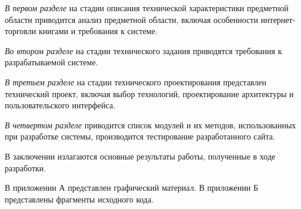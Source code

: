 \emph{В первом разделе} на стадии описания технической характеристики предметной области приводится анализ предметной области, включая особенности интернет-торговли книгами и требования к системе.

\emph{Во втором разделе} на стадии технического задания приводятся требования к разрабатываемой системе.

\emph{В третьем разделе} на стадии технического проектирования представлен технический проект, включая выбор технологий, проектирование архитектуры и пользовательского интерфейса.

\emph{В четвертом разделе} приводится список модулей и их методов, использованных при разработке системы, производится тестирование разработанного сайта.

В заключении излагаются основные результаты работы, полученные в ходе разработки.

В приложении А представлен графический материал.
В приложении Б представлены фрагменты исходного кода. 

